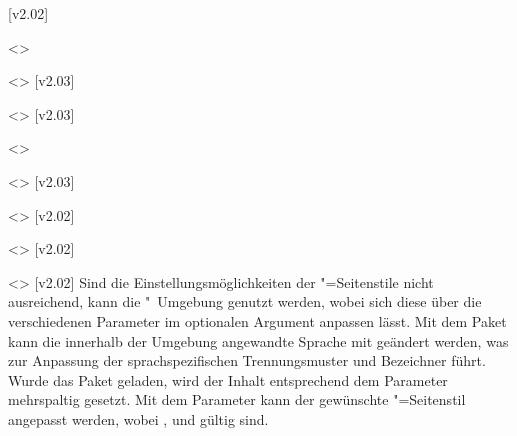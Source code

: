 \begin{DeclareEntity*}{}
\begin{DeclareEntity*}{}
\begin{DeclareEntity*}{}
\begin{Declaration}
  {}
\begin{Declaration}
  {}
\begin{Declaration}
  {}
\begin{Declaration}
  {}
  [v2.02]
\begin{Declaration}
  {}
  <>
\begin{Declaration}
  {}
  <>
  [v2.03]
\begin{Declaration}
  {}
  <>
  [v2.03]
\begin{Declaration}
  {}
  <>
\begin{Declaration}
  {}
  <>
  [v2.03]
\begin{Declaration}
  {}
  <>
  [v2.02]
\begin{Declaration}
  {}
  <>
  [v2.02]
\begin{Declaration}
  {}
  <>
  [v2.02]
Sind die Einstellungsmöglichkeiten der "=Seitenstile 
nicht ausreichend, kann die "~Umgebung genutzt werden, 
wobei sich diese über die verschiedenen Parameter im optionalen Argument 
anpassen lässt. Mit dem Paket  kann die innerhalb der Umgebung 
angewandte Sprache mit  geändert 
werden, was zur Anpassung der sprachspezifischen Trennungsmuster und Bezeichner 
führt. Wurde das Paket  geladen, wird der Inhalt entsprechend 
dem Parameter  mehrspaltig gesetzt. 
Mit dem Parameter  kann der 
gewünschte "=Seitenstil angepasst werden, wobei 
,  und  gültig sind. 


\end{Declaration}
\end{Declaration}
\end{Declaration}
\end{Declaration}
\end{Declaration}
\end{Declaration}
\end{Declaration}
\end{Declaration}
\end{Declaration}
\end{Declaration}
\end{Declaration}
\end{Declaration}
\end{DeclareEntity*}
\end{DeclareEntity*}
\end{DeclareEntity*}

